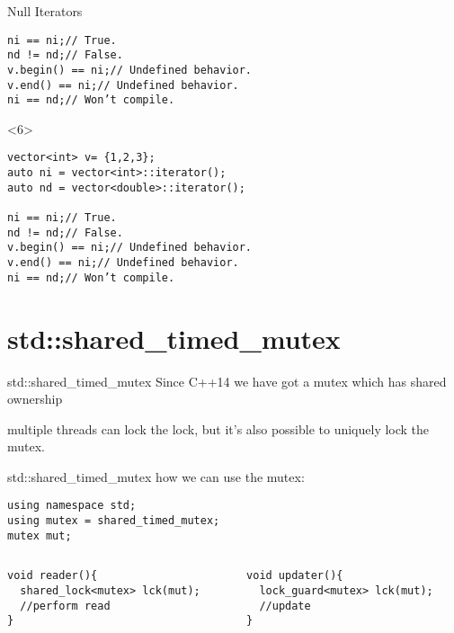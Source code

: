 \documentclass[10pt]{beamer}
\begin{document}
\begin{frame}[fragile]{Null Iterators}
\begin{onlyenv}
\begin{verbatim}
ni == ni;// True.
nd != nd;// False.
v.begin() == ni;// Undefined behavior.
v.end() == ni;// Undefined behavior. 
ni == nd;// Won’t compile.  
  \end{verbatim}
\end{onlyenv}

\begin{onlyenv}<6>
  \begin{verbatim}
vector<int> v= {1,2,3};
auto ni = vector<int>::iterator();
auto nd = vector<double>::iterator();

ni == ni;// True.
nd != nd;// False.
v.begin() == ni;// Undefined behavior.
v.end() == ni;// Undefined behavior. 
ni == nd;// Won’t compile.  
  \end{verbatim}
\end{onlyenv}

\end{frame}

\section{std::shared\_timed\_mutex}
\begin{frame}[fragile]{std::shared\_timed\_mutex}
	\centering Since C++14 we have got a mutex which has shared ownership

	\alert{multiple threads can lock} the lock, but it's also possible to \alert{uniquely} lock the mutex.

\end{frame}

\begin{frame}[fragile]{std::shared\_timed\_mutex}
	how we can use the mutex:

	\begin{verbatim}
using namespace std;	
using mutex = shared_timed_mutex;
mutex mut;	
	\end{verbatim}

	\pause
	\vfill

	\begin{columns}
	\begin{column}{0.48\linewidth}
	\begin{verbatim}
void reader(){
  shared_lock<mutex> lck(mut);
  //perform read  
}
	\end{verbatim}
	\end{column}
	\pause
	\hfill
	\begin{column}{0.48\linewidth}
	\begin{verbatim}
void updater(){
  lock_guard<mutex> lck(mut);
  //update
}	
	\end{verbatim}
	\end{column}
	
	\end{columns}
\end{frame}
\end{document}
